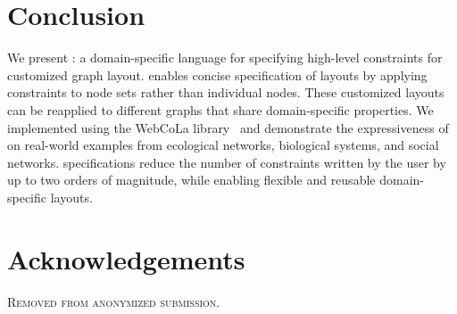 \section{Conclusion}
We present \projectname: a domain-specific language for specifying high-level
constraints for customized graph layout. \projectname enables concise 
specification of layouts by applying constraints to node sets
rather than individual nodes. These customized layouts can
be reapplied to different graphs that share domain-specific properties.
We implemented \projectname using the WebCoLa library~\cite{WebCoLa} and demonstrate the expressiveness
of \projectname on real-world examples from ecological networks,
biological systems, and social networks. \projectname specifications reduce the
number of constraints written by the user by up to two orders of magnitude,
while enabling flexible and reusable domain-specific layouts.

\section*{Acknowledgements}
\textsc{Removed from anonymized submission.}
